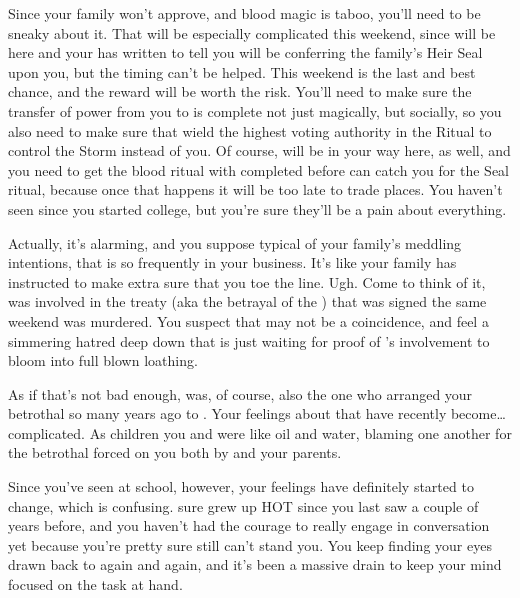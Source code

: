 \documentclass[char]{GL2020}
\begin{document}
Since your family won’t approve, and blood magic is taboo, you’ll need to be sneaky about it.  That will be especially complicated this weekend, since \cDiplomat{} will be here and your \cFaledonParent{\parent} has written to tell you \cDiplomat{\they} will be conferring the family’s Heir Seal upon you, but the timing can’t be helped.  This weekend is the last and best chance, and the reward will be worth the risk. You’ll need to make sure the transfer of power from you to \cAmbition{} is complete not just magically, but socially, so you also need to make sure that \cAmbition{\they} wield the highest voting authority in the Ritual to control the Storm instead of you. Of course, \cDiplomat{} will be in your way here, as well, and you need to get the blood ritual with \cAmbition{} completed before \cDiplomat{} can catch you for the Seal ritual, because once that happens it will be too late to trade places.  You haven’t seen \cDiplomat{} since you started college, but you’re sure they’ll be a pain about everything. 

Actually, it’s alarming, and you suppose typical of your family’s meddling intentions, that \cDiplomat{} is so frequently in your business. It’s like your family has \cDiplomat{\them} instructed to make extra sure that you toe the line. Ugh. Come to think of it, \cDiplomat{} was involved in the treaty (aka the betrayal of the \pShippies{}) that was signed the same weekend \cHeirSibling{} was murdered. You suspect that may not be a coincidence, and feel a simmering hatred deep down that is just waiting for proof of \cDiplomat{}’s involvement to bloom into full blown loathing.

As if that’s not bad enough, \cDiplomat{} was, of course, also the one who arranged your betrothal so many years ago to \cChupStudent{}.  Your feelings about that have recently become\ldots complicated. As children you and \cChupStudent{} were like oil and water, blaming one another for the betrothal forced on you both by \cDiplomat{} and your parents.  

Since you’ve seen \cChupStudent{\them} at school, however, your feelings have definitely started to change, which is confusing. \cChupStudent{} sure grew up HOT since you last saw \cChupStudent{\them} a couple of years before, and you haven’t had the courage to really engage \cChupStudent{\them} in conversation yet because you’re pretty sure \cChupStudent{\they} still can’t stand you. You keep finding your eyes drawn back to \cChupStudent{\them} again and again, and it’s been a massive drain to keep your mind focused on the task at hand. 
\end{document}
